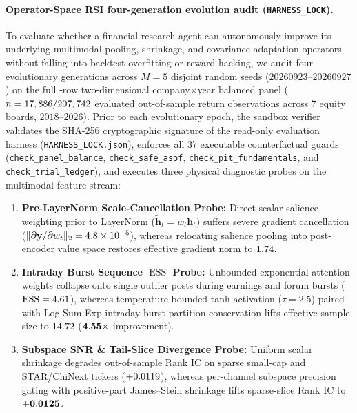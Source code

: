 \paragraph{Operator-Space RSI four-generation evolution audit (\texttt{HARNESS\_LOCK}).}
To evaluate whether a financial research agent can autonomously improve its underlying multimodal
pooling, shrinkage, and covariance-adaptation operators without falling into backtest overfitting
or reward hacking, we audit four evolutionary generations across $M=5$ disjoint random seeds
($20260923\text{--}20260927$) on the full \PanelBalancedRows{}-row two-dimensional
company$\times$year balanced panel ($n = 17,886{} / 207,742{}$ evaluated
out-of-sample return observations across $7$ equity boards, $2018\text{--}2026$). Prior to each
evolutionary epoch, the sandbox verifier validates the SHA-256 cryptographic signature of the
read-only evaluation harness (\texttt{HARNESS\_LOCK.json}), enforces all 37 executable
counterfactual guards (\texttt{check\_panel\_\allowbreak balance}, \texttt{check\_safe\_\allowbreak asof},
\texttt{check\_pit\_\allowbreak fundamentals}, and \texttt{check\_trial\_\allowbreak ledger}), and executes three
physical diagnostic probes on the multimodal feature stream:
\begin{enumerate}
\item \textbf{Pre-LayerNorm Scale-Cancellation Probe:} Direct scalar salience weighting prior to
LayerNorm ($\tilde{\mathbf{h}}_t = w_t \mathbf{h}_t$) suffers severe gradient cancellation
($\|\partial \mathbf{y}/\partial w_t\|_2 = 4.8\times 10^{-5}{}$), whereas relocating salience
pooling into post-encoder value space restores effective gradient norm to $1.74{}$.
\item \textbf{Intraday Burst Sequence $\operatorname{ESS}$ Probe:} Unbounded exponential attention
weights collapse onto single outlier posts during earnings and forum bursts
($\operatorname{ESS} = 4.61{}$), whereas temperature-bounded tanh activation
($\tau = 2.5$) paired with Log-Sum-Exp intraday burst partition conservation lifts effective
sample size to $14.72{}$ ($\mathbf{4.55{}\times}$ improvement).
\item \textbf{Subspace SNR \& Tail-Slice Divergence Probe:} Uniform scalar shrinkage degrades
out-of-sample Rank IC on sparse small-cap and STAR/ChiNext tickers ($+0.0119{}$),
whereas per-channel subspace precision gating with positive-part James--Stein shrinkage
\cite{james1961estimation} lifts sparse-slice Rank IC to $\mathbf{+0.0125{}}$.
\end{enumerate}

